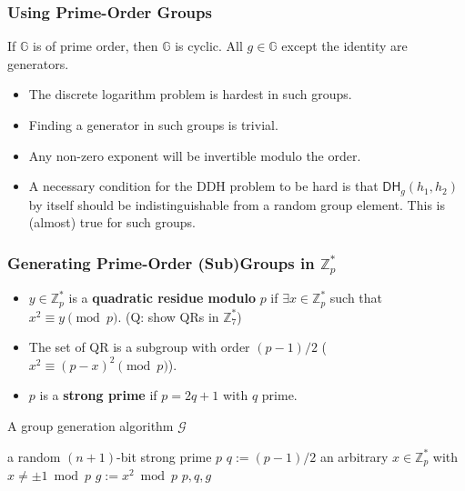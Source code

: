 \begin{frame}\frametitle{Using Prime-Order Groups}
\begin{theorem}
 If $\mathbb{G}$ is of prime order, then $\mathbb{G}$ is cyclic. All $g \in \mathbb{G}$ except the identity are generators.
\end{theorem}
\begin{itemize}
\item The discrete logarithm problem is hardest in such groups.
\item Finding a generator in such groups is trivial.
\item Any non-zero exponent will be invertible modulo the order.
\item A necessary condition for the DDH problem to be hard is that $\mathsf{DH}_g(h_1,h_2)$ by itself should be indistinguishable from a random group element. This is (almost) true for such groups.
\end{itemize}
\end{frame}
\begin{frame}\frametitle{Generating Prime-Order (Sub)Groups in $\mathbb{Z}^*_p$}
\begin{itemize}
\item $y \in \mathbb{Z}^*_p$ is a \textbf{quadratic residue modulo} $p$ if $\exists x \in \mathbb{Z}^*_p$ such that $x^2 \equiv y \pmod p$. \alert{(Q: show QRs in $\mathbb{Z}_{7}^{*}$)} %
\item The set of QR is a subgroup with order $(p-1)/2$ ($x^2 \equiv (p-x)^2 \pmod p$).
\item $p$ is a \textbf{strong prime} if $p=2q+1$ with $q$ prime.
\end{itemize}
\begin{algorithm}[H]
\DontPrintSemicolon
\caption{A group generation algorithm $\mathcal{G}$}
\BlankLine
\KwG a random $(n+1)$-bit strong prime $p$\;
$q := (p-1)/2$\;
\KwC an arbitrary $x \in \mathbb{Z}^*_p$ with $x \neq \pm 1 \bmod p$\;
$g := x^2 \bmod p$\;
\Return $p,q,g$
\end{algorithm}
\end{frame}
